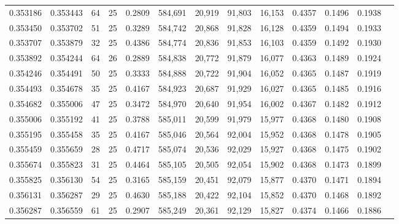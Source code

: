 \begin{tabular}{rrrrrrrrrrrrr}
0.353186 & 0.353443 &    64 &  25 &                                     0.2809 & 584,691 &  20,919 &  91,803 &  16,153 & 0.4357 & 0.1496 & 0.1938 \\
0.353450 & 0.353702 &    51 &  25 &                                     0.3289 & 584,742 &  20,868 &  91,828 &  16,128 & 0.4359 & 0.1494 & 0.1933 \\
0.353707 & 0.353879 &    32 &  25 &                                     0.4386 & 584,774 &  20,836 &  91,853 &  16,103 & 0.4359 & 0.1492 & 0.1930 \\
0.353892 & 0.354244 &    64 &  26 &                                     0.2889 & 584,838 &  20,772 &  91,879 &  16,077 & 0.4363 & 0.1489 & 0.1924 \\
0.354246 & 0.354491 &    50 &  25 &                                     0.3333 & 584,888 &  20,722 &  91,904 &  16,052 & 0.4365 & 0.1487 & 0.1919 \\
0.354493 & 0.354678 &    35 &  25 &                                     0.4167 & 584,923 &  20,687 &  91,929 &  16,027 & 0.4365 & 0.1485 & 0.1916 \\
0.354682 & 0.355006 &    47 &  25 &                                     0.3472 & 584,970 &  20,640 &  91,954 &  16,002 & 0.4367 & 0.1482 & 0.1912 \\
0.355006 & 0.355192 &    41 &  25 &                                     0.3788 & 585,011 &  20,599 &  91,979 &  15,977 & 0.4368 & 0.1480 & 0.1908 \\
0.355195 & 0.355458 &    35 &  25 &                                     0.4167 & 585,046 &  20,564 &  92,004 &  15,952 & 0.4368 & 0.1478 & 0.1905 \\
0.355459 & 0.355659 &    28 &  25 &                                     0.4717 & 585,074 &  20,536 &  92,029 &  15,927 & 0.4368 & 0.1475 & 0.1902 \\
0.355674 & 0.355823 &    31 &  25 &                                     0.4464 & 585,105 &  20,505 &  92,054 &  15,902 & 0.4368 & 0.1473 & 0.1899 \\
0.355825 & 0.356130 &    54 &  25 &                                     0.3165 & 585,159 &  20,451 &  92,079 &  15,877 & 0.4370 & 0.1471 & 0.1894 \\
0.356131 & 0.356287 &    29 &  25 &                                     0.4630 & 585,188 &  20,422 &  92,104 &  15,852 & 0.4370 & 0.1468 & 0.1892 \\
0.356287 & 0.356559 &    61 &  25 &                                     0.2907 & 585,249 &  20,361 &  92,129 &  15,827 & 0.4374 & 0.1466 & 0.1886 \\

\end{tabular}
